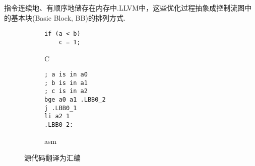 指令连续地、有顺序地储存在内存中.LLVM中，这些优化过程抽象成控制流图中的基本块(Basic Block, BB)的排列方式.

\begin{figure}[H]
    \centering
    \begin{subfigure}[b]{0.2\textwidth}
        \centering
        \begin{lstlisting}
if (a < b)
    c = 1;\end{lstlisting}
        \caption{C}
    \end{subfigure}
    \begin{subfigure}[b]{0.2\textwidth}
        \centering
        \begin{lstlisting}[language={[RISC-V]Assembler}]
; a is in a0
; b is in a1
; c is in a2
bge a0 a1 .LBB0_2
j .LBB0_1
li a2 1
.LBB0_2:\end{lstlisting}
        \caption{asm}
    \end{subfigure}
    \caption{源代码翻译为汇编}
\end{figure}